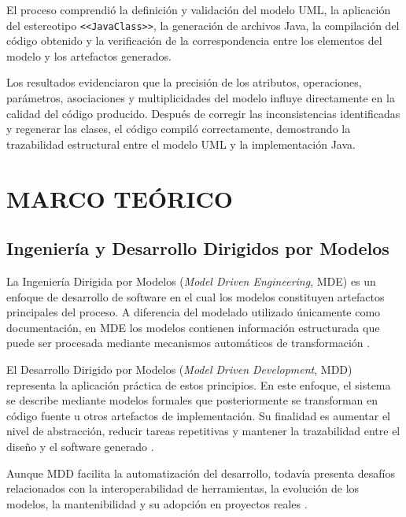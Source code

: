 \documentclass[10pt,a4paper,openany]{report}
\begin{document}
	El proceso comprendió la definición y validación del modelo UML, la
	aplicación del estereotipo
	\texttt{\textless\textless JavaClass\textgreater\textgreater}, la
	generación de archivos Java, la compilación del código obtenido y la
	verificación de la correspondencia entre los elementos del modelo y los
	artefactos generados.
	
	Los resultados evidenciaron que la precisión de los atributos,
	operaciones, parámetros, asociaciones y multiplicidades del modelo
	influye directamente en la calidad del código producido. Después de
	corregir las inconsistencias identificadas y regenerar las clases, el
	código compiló correctamente, demostrando la trazabilidad estructural
	entre el modelo UML y la implementación Java.
	
	
	
	
	
	
	\chapter{MARCO TEÓRICO}
	
	\section{Ingeniería y Desarrollo Dirigidos por Modelos}
	
	La Ingeniería Dirigida por Modelos
	(\textit{Model Driven Engineering}, MDE) es un enfoque de desarrollo de
	software en el cual los modelos constituyen artefactos principales del
	proceso. A diferencia del modelado utilizado únicamente como
	documentación, en MDE los modelos contienen información estructurada que
	puede ser procesada mediante mecanismos automáticos de transformación
	\cite{schmidt2006}.
	
	El Desarrollo Dirigido por Modelos
	(\textit{Model Driven Development}, MDD) representa la aplicación
	práctica de estos principios. En este enfoque, el sistema se describe
	mediante modelos formales que posteriormente se transforman en código
	fuente u otros artefactos de implementación. Su finalidad es aumentar el
	nivel de abstracción, reducir tareas repetitivas y mantener la
	trazabilidad entre el diseño y el software generado
	\cite{brambilla2017}.
	
	Aunque MDD facilita la automatización del desarrollo, todavía presenta
	desafíos relacionados con la interoperabilidad de herramientas, la
	evolución de los modelos, la mantenibilidad y su adopción en proyectos
	reales \cite{bucchiarone2020}.
	
\end{document}
